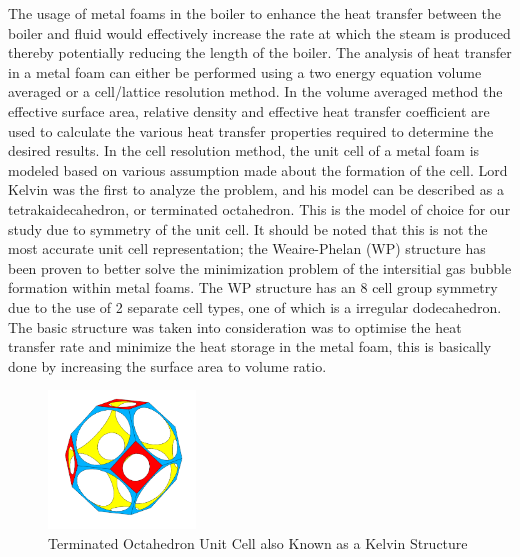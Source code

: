 \documentclass[compileTAMUreport.tex]{subfiles}
\begin{document}
The usage of metal foams in the boiler to enhance the heat transfer between the boiler and fluid  would effectively increase the rate at which the steam is produced thereby potentially reducing the length of the boiler.
The analysis of heat transfer in a metal foam can either be performed using a two energy equation volume averaged or a cell/lattice resolution method.
In the volume averaged method the effective surface area, relative density and effective heat transfer coefficient  are used to calculate the various heat transfer properties required to determine the desired results.
\cite{Du2010}
In the cell resolution method, the unit cell of a metal foam is modeled based on various assumption made about the formation of the cell. 
Lord Kelvin was the first to analyze the problem, and his model can be described as a tetrakaidecahedron, or terminated octahedron.
\cite{Kopanidis2010}
This is the model of choice for our study due to symmetry of the unit cell.
It should be noted that this is not the most accurate unit cell representation; the Weaire-Phelan (WP) structure has been proven to better solve the minimization problem of the intersitial gas bubble formation within metal foams. 
The WP structure has an 8 cell group symmetry due to the use of 2 separate cell types, one of which is a irregular dodecahedron.
The basic structure was taken into consideration was to optimise the heat transfer rate and minimize the heat storage in the metal foam, this is basically done by increasing the surface area to volume ratio.
\cite{Kusner1996}


\begin{figure}[t]
\begin{center}
\includegraphics[width=0.35\textwidth]{./figure/TruncatedOctohedronSphereRemoved}
\end{center}
\caption{Terminated Octahedron Unit Cell also Known as a Kelvin Structure}
\label{fig:trucOctModel-UnitCell}
\end{figure}
\end{document}
